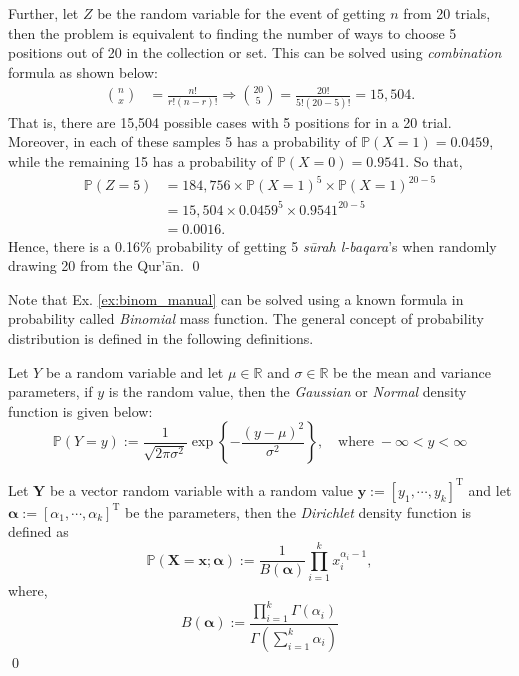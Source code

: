 \begin{exmpx}
Further, let $Z$ be the random variable for the event of getting $n$  from 20 trials, then the problem is equivalent to finding the number of ways to choose 5 positions out of 20 in the collection or set. This can be solved using \textit{combination} formula as shown below:
\begin{align}
    n \choose x &= \frac{n!}{r!(n-r)!}\Rightarrow{20 \choose 5} = \frac{20!}{5!(20-5)!}=15,504. 
\end{align}
That is, there are 15,504 possible cases with 5 positions for  in a 20 trial. Moreover, in each of these samples 5 has a probability of $\mathbb{P}(X=1)=0.0459$, while the remaining 15 has a probability of $\mathbb{P}(X=0)=0.9541$. So that,
\begin{align}
    \mathbb{P}(Z=5)&=184,756\times\mathbb{P}(X=1)^{5}\times\mathbb{P}(X=1)^{20-5}\nonumber\\
    &=15,504\times0.0459^{5}\times0.9541^{20-5}\nonumber\\
    &=0.0016.
\end{align}
Hence, there is a 0.16\% probability of getting 5 \textit{s\=urah l-baqara}'s   when randomly drawing 20  from the Qur'\=an.
\qed
\end{exmpx}
Note that Ex. \ref{ex:binom_manual} can be solved using a known formula in probability called \textit{Binomial} mass function. The general concept of probability distribution is defined in the following definitions.
\begin{defnx}
Let $Y$ be a random variable and let $\mu\in\mathbb{R}$ and $\sigma\in\mathbb{R}$ be the mean and variance parameters, if $y$ is the random value, then the \textit{Gaussian} or \textit{Normal} density function is given below:
\begin{equation}
    \mathbb{P}(Y=y):=\frac{1}{\sqrt{2\pi\sigma^2}}\exp\left\{-\frac{(y-\mu)^2}{\sigma^2}\right\},\quad\text{where}\;-\infty<y<\infty
\end{equation}
\end{defnx}
\begin{defnx}
Let $\mathbf{Y}$ be a vector random variable with a random value $\mathbf{y}:=[y_1,\cdots,y_k]^{\text{T}}$ and let $\boldsymbol{\alpha}:=[\alpha_1,\cdots,\alpha_k]^{\text{T}}$ be the parameters, then the \textit{Dirichlet} density function is defined as
\begin{equation}
    \mathbb{P}(\mathbf{X}=\mathbf{x};\boldsymbol{\alpha}):=\frac{1}{B(\boldsymbol{\alpha})}\prod_{i=1}^kx_i^{\alpha_i-1},
\end{equation}
where,
\begin{equation}
    B(\boldsymbol{\alpha}):=\frac{\displaystyle\prod_{i=1}^k\Gamma(\alpha_i)}{\Gamma\left(\sum_{i=1}^k\alpha_i\right)}
\end{equation}
\qed
\end{defnx}
